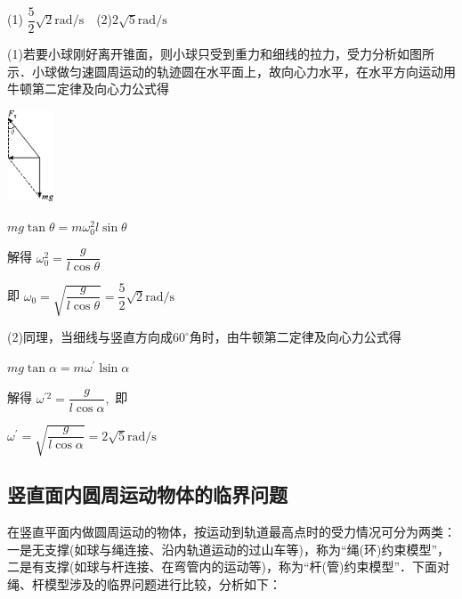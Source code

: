 \begin{solution}(1) $\dfrac{5}{2} \sqrt{2} \mathrm{rad} / \mathrm{s}$　(2)$2 \sqrt{5} \mathrm{rad} / \mathrm{s}$

	(1)若要小球刚好离开锥面，则小球只受到重力和细线的拉力，受力分析如图所示．小球做匀速圆周运动的轨迹圆在水平面上，故向心力水平，在水平方向运动用牛顿第二定律及向心力公式得

\begin{center}\includegraphics[width=0.55in,height=1.06667in]{media/image186.png}\end{center}

$m g \tan \theta=m \omega_{0}^{2} l \sin \theta$

解得 $\omega_{0}^{2}=\dfrac{g}{l \cos \theta}$

即 $\omega_{0}=\sqrt{\dfrac{g}{l \cos \theta}}=\dfrac{5}{2} \sqrt{2} \mathrm{rad} / \mathrm{s}$

(2)同理，当细线与竖直方向成$60^\circ$角时，由牛顿第二定律及向心力公式得

$mg\tan \alpha=m \omega^{\prime} \operatorname{lsin} \alpha$

解得 $\omega^{\prime 2}=\dfrac{g}{l \cos \alpha},$ 即

$\omega^{\prime}=\sqrt{\dfrac{g}{l \cos \alpha}}=2 \sqrt{5} \mathrm{rad} / \mathrm{s}$
\end{solution}
\newpage
\subsection{竖直面内圆周运动物体的临界问题}

在竖直平面内做圆周运动的物体，按运动到轨道最高点时的受力情况可分为两类：一是无支撑(如球与绳连接、沿内轨道运动的过山车等)，称为``绳(环)约束模型''，二是有支撑(如球与杆连接、在弯管内的运动等)，称为``杆(管)约束模型''．下面对绳、杆模型涉及的临界问题进行比较，分析如下：

